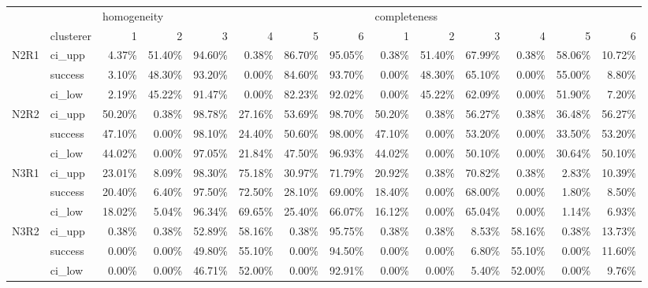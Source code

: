 \begin{tabular}{llrrrrrrrrrrrr}
\toprule
     & {} & \multicolumn{6}{l}{homogeneity} & \multicolumn{6}{l}{completeness} \\
     & clusterer &           1 &      2 &      3 &      4 &      5 &      6 &            1 &      2 &      3 &      4 &      5 &      6 \\
\midrule
N2R1 & ci\_upp &       4.37\% & 51.40\% & 94.60\% &  0.38\% & 86.70\% & 95.05\% &        0.38\% & 51.40\% & 67.99\% &  0.38\% & 58.06\% & 10.72\% \\
     & success &       3.10\% & 48.30\% & 93.20\% &  0.00\% & 84.60\% & 93.70\% &        0.00\% & 48.30\% & 65.10\% &  0.00\% & 55.00\% &  8.80\% \\
     & ci\_low &       2.19\% & 45.22\% & 91.47\% &  0.00\% & 82.23\% & 92.02\% &        0.00\% & 45.22\% & 62.09\% &  0.00\% & 51.90\% &  7.20\% \\
N2R2 & ci\_upp &      50.20\% &  0.38\% & 98.78\% & 27.16\% & 53.69\% & 98.70\% &       50.20\% &  0.38\% & 56.27\% &  0.38\% & 36.48\% & 56.27\% \\
     & success &      47.10\% &  0.00\% & 98.10\% & 24.40\% & 50.60\% & 98.00\% &       47.10\% &  0.00\% & 53.20\% &  0.00\% & 33.50\% & 53.20\% \\
     & ci\_low &      44.02\% &  0.00\% & 97.05\% & 21.84\% & 47.50\% & 96.93\% &       44.02\% &  0.00\% & 50.10\% &  0.00\% & 30.64\% & 50.10\% \\
N3R1 & ci\_upp &      23.01\% &  8.09\% & 98.30\% & 75.18\% & 30.97\% & 71.79\% &       20.92\% &  0.38\% & 70.82\% &  0.38\% &  2.83\% & 10.39\% \\
     & success &      20.40\% &  6.40\% & 97.50\% & 72.50\% & 28.10\% & 69.00\% &       18.40\% &  0.00\% & 68.00\% &  0.00\% &  1.80\% &  8.50\% \\
     & ci\_low &      18.02\% &  5.04\% & 96.34\% & 69.65\% & 25.40\% & 66.07\% &       16.12\% &  0.00\% & 65.04\% &  0.00\% &  1.14\% &  6.93\% \\
N3R2 & ci\_upp &       0.38\% &  0.38\% & 52.89\% & 58.16\% &  0.38\% & 95.75\% &        0.38\% &  0.38\% &  8.53\% & 58.16\% &  0.38\% & 13.73\% \\
     & success &       0.00\% &  0.00\% & 49.80\% & 55.10\% &  0.00\% & 94.50\% &        0.00\% &  0.00\% &  6.80\% & 55.10\% &  0.00\% & 11.60\% \\
     & ci\_low &       0.00\% &  0.00\% & 46.71\% & 52.00\% &  0.00\% & 92.91\% &        0.00\% &  0.00\% &  5.40\% & 52.00\% &  0.00\% &  9.76\% \\

\end{tabular}
